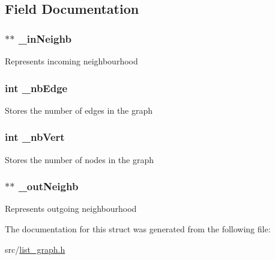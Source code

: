 \subsection{Field Documentation}
\hypertarget{struct_list_graph_aa1424e60acb846a17dd5429ad3fb9274}{
\subsubsection[{\-\_\-in\-Neighb}]{$\ast$$\ast$ {\bf \-\_\-in\-Neighb}}}\label{struct_list_graph_aa1424e60acb846a17dd5429ad3fb9274}
Represents incoming neighbourhood \hypertarget{struct_list_graph_a69fef280661aff966495a7c668e73284}{
\subsubsection[{\-\_\-nb\-Edge}]{\setlength{\rightskip}{0pt plus 5cm}int {\bf \-\_\-nb\-Edge}}}\label{struct_list_graph_a69fef280661aff966495a7c668e73284}
Stores the number of edges in the graph \hypertarget{struct_list_graph_a3da3524d8a5c0b61107c4d25f8d23832}{
\subsubsection[{\-\_\-nb\-Vert}]{\setlength{\rightskip}{0pt plus 5cm}int {\bf \-\_\-nb\-Vert}}}\label{struct_list_graph_a3da3524d8a5c0b61107c4d25f8d23832}
Stores the number of nodes in the graph \hypertarget{struct_list_graph_a386fbb3e3e91bf7bc246642dec395fcc}{
\subsubsection[{\-\_\-out\-Neighb}]{$\ast$$\ast$ {\bf \-\_\-out\-Neighb}}}\label{struct_list_graph_a386fbb3e3e91bf7bc246642dec395fcc}
Represents outgoing neighbourhood 

The documentation for this struct was generated from the following file\-:\begin{DoxyCompactItemize}
\item 
src/\hyperlink{list__graph_8h}{list\-\_\-graph.\-h}\end{DoxyCompactItemize}
